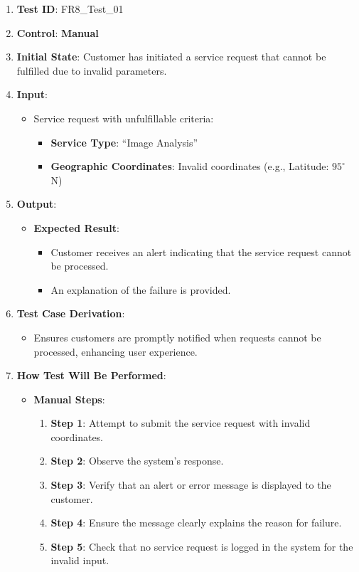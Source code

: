 \documentclass[12pt, titlepage]{article}
\begin{document}
\begin{enumerate}
    \item \textbf{Test ID}: FR8\_Test\_01
    \item \textbf{Control}: \textbf{Manual}
    \item \textbf{Initial State}: Customer has initiated a service request that cannot be fulfilled due to invalid parameters.
    \item \textbf{Input}:
    \begin{itemize}
        \item Service request with unfulfillable criteria:
        \begin{itemize}
            \item \textbf{Service Type}: ``Image Analysis''
            \item \textbf{Geographic Coordinates}: Invalid coordinates (e.g., Latitude: $95^\circ$ N)
        \end{itemize}
    \end{itemize}
    \item \textbf{Output}:
    \begin{itemize}
        \item \textbf{Expected Result}:
        \begin{itemize}
            \item Customer receives an alert indicating that the service request cannot be processed.
            \item An explanation of the failure is provided.
        \end{itemize}
    \end{itemize}
    \item \textbf{Test Case Derivation}:
    \begin{itemize}
        \item Ensures customers are promptly notified when requests cannot be processed, enhancing user experience.
    \end{itemize}
    \item \textbf{How Test Will Be Performed}:
    \begin{itemize}
        \item \textbf{Manual Steps}:
        \begin{enumerate}
            \item \textbf{Step 1}: Attempt to submit the service request with invalid coordinates.
            \item \textbf{Step 2}: Observe the system's response.
            \item \textbf{Step 3}: Verify that an alert or error message is displayed to the customer.
            \item \textbf{Step 4}: Ensure the message clearly explains the reason for failure.
            \item \textbf{Step 5}: Check that no service request is logged in the system for the invalid input.
        \end{enumerate}
    \end{itemize}
\end{enumerate}
\end{document}
